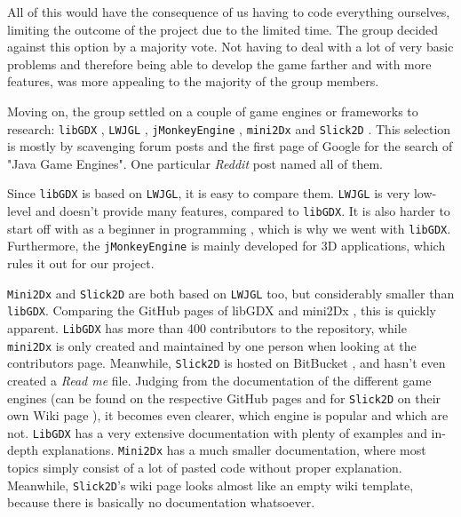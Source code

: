 \documentclass[12p]{article}
\begin{document}
All of this would have the consequence of us having to code everything ourselves, limiting the outcome of the project due to the limited time. The group decided against this option by a majority vote. Not having to deal with a lot of very basic problems and therefore being able to develop the game farther and with more features, was more appealing to the majority of the group members.

Moving on, the group settled on a couple of game engines or frameworks to research: \texttt{libGDX} \cite{libGDX}, \texttt{LWJGL} \cite{LWJGL}, \texttt{jMonkeyEngine} \cite{jMonkeyEngine}, \texttt{mini2Dx} \cite{mini2Dx} and \texttt{Slick2D} \cite{Slick2D}. This selection is mostly by scavenging forum posts and the first page of Google for the search of "Java Game Engines". One particular \emph{Reddit} post \cite{RedditJavaGameEngines} named all of them.

Since \texttt{libGDX} is based on \texttt{LWJGL}, it is easy to compare them. \texttt{LWJGL} is very low-level and doesn't provide many features, compared to \texttt{libGDX}. It is also harder to start off with as a beginner in programming \cite{StackExchangeLibGDXLWJGL}, which is why we went with \texttt{libGDX}. Furthermore, the \texttt{jMonkeyEngine} is mainly developed for 3D applications, which rules it out for our project. 

\texttt{Mini2Dx} and \texttt{Slick2D} are both based on \texttt{LWJGL} too, but considerably smaller than \texttt{libGDX}. Comparing the GitHub pages of libGDX \cite{libgDXGitHub} and mini2Dx \cite{mini2DxGitHub}, this is quickly apparent. \texttt{LibGDX} has more than 400 contributors to the repository, while \texttt{mini2Dx} is only created and maintained by one person when looking at the contributors page. Meanwhile, \texttt{Slick2D} is hosted on BitBucket \cite{Slick2DBitBucket}, and hasn't even created a \emph{Read me} file. Judging from the documentation of the different game engines (can be found on the respective GitHub pages and for \texttt{Slick2D} on their own Wiki page \cite{Slick2DWiki}), it becomes even clearer, which engine is popular and which are not. \texttt{LibGDX} has a very extensive documentation with plenty of examples and in-depth explanations. \texttt{Mini2Dx} has a much smaller documentation, where most topics simply consist of a lot of pasted code without proper explanation. Meanwhile, \texttt{Slick2D}'s wiki page looks almost like an empty wiki template, because there is basically no documentation whatsoever.
\end{document}
